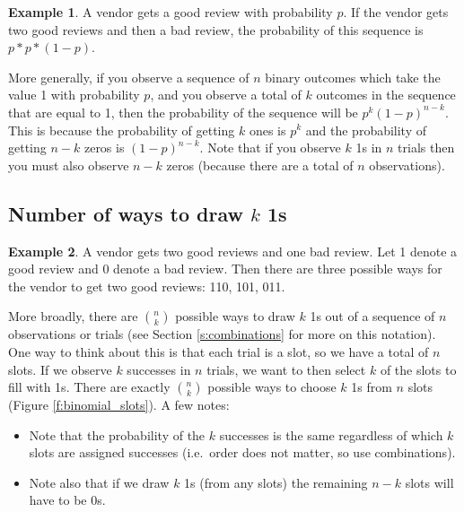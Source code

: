 \documentclass[]{article}
\theoremstyle{definition}
\newtheorem{exmp}{Example}[section]
\begin{document}
\begin{exmp}
A vendor gets a good review with probability $p$. If the vendor gets two good reviews and then a bad review, the probability of this sequence is $p * p * (1-p)$.
\end{exmp}

More generally, if you observe a sequence of $n$ binary outcomes which take the value 1 with probability $p$, and you observe a total of $k$ outcomes in the sequence that are equal to 1, then the probability of the sequence will be $p^k (1-p)^{n-k}$. This is because the probability of getting $k$ ones is $p^k$ and the probability of getting $n-k$ zeros is $(1-p)^{n-k}$. Note that if you observe $k$ 1s in $n$ trials then you must also observe $n-k$ zeros (because there are a total of $n$ observations).

 \subsection{Number of ways to draw $k$ 1s}
 
\begin{exmp}
A vendor gets two good reviews and one bad review. Let 1 denote a good review and 0 denote a bad review. Then there are three possible ways for the vendor to get two good reviews: 110, 101, 011.
\end{exmp}

\noindent More broadly, there are $n \choose k$ possible ways to draw $k$ 1s out of a sequence of $n$ observations or trials (see Section \ref{s:combinations} for more on this notation). One way to think about this is that each trial is a slot, so we have a total of  $n$ slots. If we observe $k$ successes in $n$ trials, we want to then select $k$ of the slots to fill with 1s. There are exactly $n \choose k$ possible ways to choose $k$ 1s from $n$ slots (Figure \ref{f:binomial_slots}). A few notes:
\begin{itemize}
\item Note that the probability of the $k$ successes is the same regardless of which $k$ slots are assigned successes (i.e.\ order does not matter, so use combinations).
\item Note also that if we draw $k$ 1s (from any slots) the remaining $n-k$ slots will have to be 0s.
\end{itemize}
\end{document}
